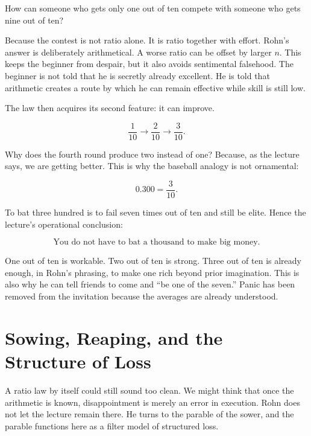 How can someone who gets only one out of ten compete with someone who gets nine out of ten?

Because the contest is not ratio alone. It is ratio together with effort. Rohn's answer is deliberately arithmetical. A worse ratio can be offset by larger \(n\). This keeps the beginner from despair, but it also avoids sentimental falsehood. The beginner is not told that he is secretly already excellent. He is told that arithmetic creates a route by which he can remain effective while skill is still low.

The law then acquires its second feature: it can improve.

\begin{equation}
\frac{1}{10} \longrightarrow \frac{2}{10} \longrightarrow \frac{3}{10}.
\end{equation}

Why does the fourth round produce two instead of one? Because, as the lecture says, we are getting better. This is why the baseball analogy is not ornamental:

\begin{equation}
0.300 = \frac{3}{10}.
\end{equation}

To bat three hundred is to fail seven times out of ten and still be elite. Hence the lecture's operational conclusion:

\begin{equation}
\text{You do not have to bat a thousand to make big money.}
\end{equation}

One out of ten is workable. Two out of ten is strong. Three out of ten is already enough, in Rohn's phrasing, to make one rich beyond prior imagination. This is also why he can tell friends to come and ``be one of the seven.'' Panic has been removed from the invitation because the averages are already understood.

\section{Sowing, Reaping, and the Structure of Loss}

A ratio law by itself could still sound too clean. We might think that once the arithmetic is known, disappointment is merely an error in execution. Rohn does not let the lecture remain there. He turns to the parable of the sower, and the parable functions here as a filter model of structured loss.

